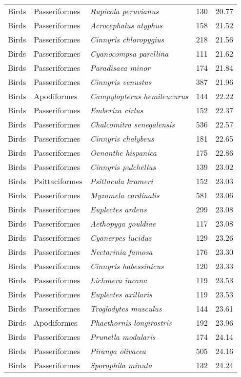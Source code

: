 \begin{longtable}{ll>{\itshape}lcc}
  Birds & Passeriformes & Rupicola peruvianus & 130 & 20.77 \\ 
  Birds & Passeriformes & Acrocephalus atyphus & 158 & 21.52 \\ 
  Birds & Passeriformes & Cinnyris chloropygius & 218 & 21.56 \\ 
  Birds & Passeriformes & Cyanocompsa parellina & 111 & 21.62 \\ 
  Birds & Passeriformes & Paradisaea minor & 174 & 21.84 \\ 
  Birds & Passeriformes & Cinnyris venustus & 387 & 21.96 \\ 
  Birds & Apodiformes & Campylopterus hemileucurus & 144 & 22.22 \\ 
  Birds & Passeriformes & Emberiza cirlus & 152 & 22.37 \\ 
  Birds & Passeriformes & Chalcomitra senegalensis & 536 & 22.57 \\ 
  Birds & Passeriformes & Cinnyris chalybeus & 181 & 22.65 \\ 
  Birds & Passeriformes & Oenanthe hispanica & 175 & 22.86 \\ 
  Birds & Passeriformes & Cinnyris pulchellus & 139 & 23.02 \\ 
  Birds & Psittaciformes & Psittacula krameri & 152 & 23.03 \\ 
  Birds & Passeriformes & Myzomela cardinalis & 581 & 23.06 \\ 
  Birds & Passeriformes & Euplectes ardens & 299 & 23.08 \\ 
  Birds & Passeriformes & Aethopyga gouldiae & 117 & 23.08 \\ 
  Birds & Passeriformes & Cyanerpes lucidus & 129 & 23.26 \\ 
  Birds & Passeriformes & Nectarinia famosa & 176 & 23.30 \\ 
  Birds & Passeriformes & Cinnyris habessinicus & 120 & 23.33 \\ 
  Birds & Passeriformes & Lichmera incana & 119 & 23.53 \\ 
  Birds & Passeriformes & Euplectes axillaris & 119 & 23.53 \\ 
  Birds & Passeriformes & Troglodytes musculus & 144 & 23.61 \\ 
  Birds & Apodiformes & Phaethornis longirostris & 192 & 23.96 \\ 
  Birds & Passeriformes & Prunella modularis & 174 & 24.14 \\ 
  Birds & Passeriformes & Piranga olivacea & 505 & 24.16 \\ 
  Birds & Passeriformes & Sporophila minuta & 132 & 24.24 \\ 

\end{longtable}
